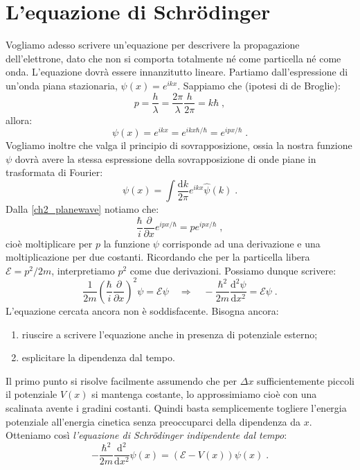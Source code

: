 \documentclass[12pt,a4paper]{report}
\theoremstyle{definition}
\newcommand{\dev}[3][]{\frac{\mathrm{d}^{#1} #2}{\mathrm{d} #3^{#1}}}
\numberwithin{equation}{section}
\newcommand{\diff}[1][]{\mathrm{d}#1}
\begin{document}
\section{L'equazione di Schrödinger}
Vogliamo adesso scrivere un'equazione per descrivere la propagazione dell'elettrone, dato che non si comporta totalmente né come particella né come onda. L'equazione dovrà essere innanzitutto lineare. Partiamo dall'espressione di un'onda piana stazionaria, $\psi(x)=e^{ikx}$. Sappiamo che (ipotesi di de Broglie):
$$
p=\frac{h}{\lambda}=\frac{2\pi}{\lambda}\frac{h}{2\pi}=k\hbar\;,
$$
allora:
\begin{equation}
\psi(x)=e^{ikx}=e^{ikx\hbar/\hbar}=e^{ipx/\hbar}\;. \label{ch2_planewave}
\end{equation}
Vogliamo inoltre che valga il principio di sovrapposizione, ossia la nostra funzione $\psi$ dovrà avere la stessa espressione della sovrapposizione di onde piane in trasformata di Fourier:
\begin{equation}
\psi(x)=\int \frac{\diff{k}}{2\pi}e^{ikx}\hat{\psi}(k)\;.
\end{equation}
Dalla \eqref{ch2_planewave} notiamo che:
$$
\frac{\hbar}{i}\frac{\partial}{\partial x}e^{ipx/\hbar}=pe^{ipx/\hbar}\;,
$$
cioè moltiplicare per $p$ la funzione $\psi$ corrisponde ad una derivazione e una moltiplicazione per due costanti. Ricordando che per la particella libera $\mathcal{E}=p^2/2m$, interpretiamo $p^2$ come due derivazioni. Possiamo dunque scrivere:
\begin{equation}
\frac{1}{2m}\left(\frac{\hbar}{i}\frac{\partial}{\partial x}\right)^2\psi=\mathcal{E}\psi\quad  \Longrightarrow\quad -\frac{\hbar^2}{2m}\dev[2]{\psi}{x}=\mathcal{E}\psi\;.
\end{equation}
L'equazione cercata ancora non è soddisfacente. Bisogna ancora:
\begin{enumerate}
\item riuscire a scrivere l'equazione anche in presenza di potenziale esterno;
\item esplicitare la dipendenza dal tempo.
\end{enumerate}
Il primo punto si risolve facilmente assumendo che per $\Delta x$ sufficientemente piccoli il potenziale $V(x)$ si mantenga costante, lo approssimiamo cioè con una scalinata avente i gradini costanti. Quindi basta semplicemente togliere l'energia potenziale all'energia cinetica senza preoccuparci della dipendenza da $x$. Otteniamo così \textit{l'equazione di Schrödinger indipendente dal tempo}:
\begin{equation}
-\frac{\hbar^2}{2m}\frac{\mathrm{d}^2}{\diff{x}^2}\psi(x)= (\mathcal{E}-V(x))\psi(x)\;. \label{ch2_schrotimeindip}
\end{equation}
\end{document}
